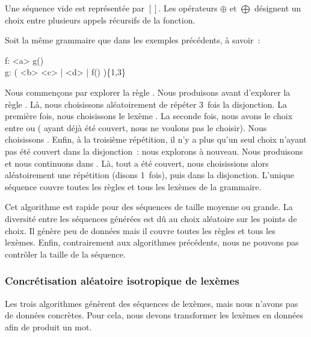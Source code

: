 Une séquence vide est représentée par $[]$. Les opérateurs $\oplus$ et
$\bigoplus$ désignent un choix entre plusieurs appels récursifs de la fonction.

\begin{example}
\label{example:data:coverage_based_generation}

Soit la même grammaire que dans les exemples précédents, à savoir~:

\begin{pre}
f: <a> g() \\
g: ( <b> <c> | <d> | f() )\{1,3\}
\end{pre}

Nous commençons par explorer la règle . Nous produisons  avant
d'explorer la règle . Là, nous choisissons aléatoirement de répéter
3~fois la disjonction. La première fois, nous choisissons le lexème .
La seconde fois, nous avons le choix entre  ou 
( ayant déjà été couvert, nous ne voulons pas le choisir). Nous
choisissons . Enfin, à la troisième répétition, il n'y a plus
qu'un seul choix n'ayant pas été couvert dans la disjonction~: nous explorons
 à nouveau. Nous produisons  et nous continuons dans .
Là, tout a été couvert, nous choisissions alors aléatoirement une répétition
(disons 1~fois), puis  dans la disjonction. L'unique séquence
 couvre toutes les règles et tous les lexèmes de
la grammaire.

\end{example}

Cet algorithme est rapide pour des séquences de taille moyenne ou grande. La
diversité entre les séquences générées est dû au choix aléatoire sur les points
de choix. Il génère peu de données mais il couvre toutes les règles et tous les
lexèmes. Enfin, contrairement aux algorithmes précédents, nous ne pouvons pas
contrôler la taille de la séquence.

\subsubsection{Concrétisation aléatoire isotropique de lexèmes}
\label{subsection:data:isotropic_generation}

Les trois algorithmes génèrent des séquences de lexèmes, mais nous n'avons pas
de données concrètes. Pour cela, nous devons transformer les lexèmes en données
afin de produit un mot.

